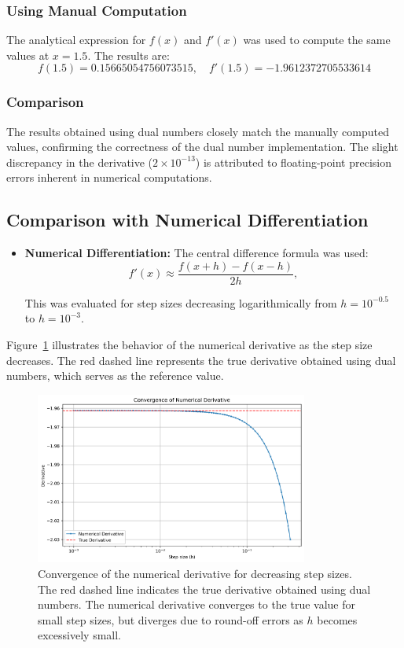 \documentclass[a4paper,12pt]{article}
\begin{document}
\subsubsection{Using Manual Computation}
The analytical expression for \(f(x)\) and \(f'(x)\) was used to compute the same values at \(x = 1.5\). The results are:
\[
f(1.5) = 0.15665054756073515, \quad f'(1.5) = -1.9612372705533614
\]

\subsubsection{Comparison}
The results obtained using dual numbers closely match the manually computed values, confirming the correctness of the dual number implementation. The slight discrepancy in the derivative (\(2 \times 10^{-13}\)) is attributed to floating-point precision errors inherent in numerical computations.

\subsection{Comparison with Numerical Differentiation}

\begin{itemize}
    \item \textbf{Numerical Differentiation:} The central difference formula was used:
    \begin{equation}
        f'(x) \approx \frac{f(x + h) - f(x - h)}{2h},
        \label{eq:central_difference}
    \end{equation}
    
    This was evaluated for step sizes decreasing logarithmically from \(h = 10^{-0.5}\) to \(h = 10^{-3}\).
\end{itemize}

Figure~\ref{fig:convergence_derivative} illustrates the behavior of the numerical derivative as the step size decreases. The red dashed line represents the true derivative obtained using dual numbers, which serves as the reference value.

\begin{figure}[h!]
    \centering
    \includegraphics[width=0.8\textwidth]{convergence_derivative.png}
    \caption{Convergence of the numerical derivative for decreasing step sizes. The red dashed line indicates the true derivative obtained using dual numbers. The numerical derivative converges to the true value for small step sizes, but diverges due to round-off errors as \(h\) becomes excessively small.}
    \label{fig:convergence_derivative}
\end{figure}
\end{document}
